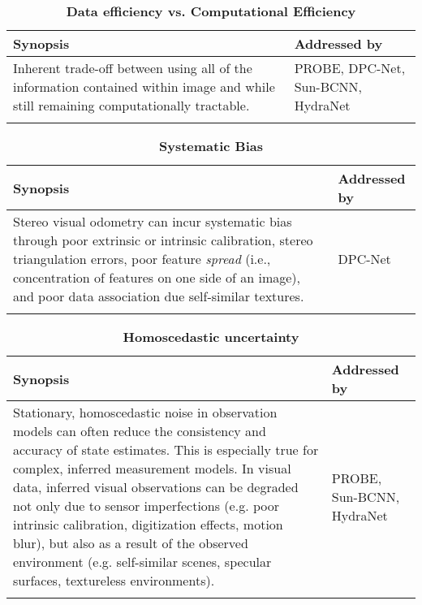\begin{table}[h!]
	\caption{\textbf{Data efficiency vs. Computational Efficiency}}	\begin{threeparttable}
	\begin{tabular}{m{}m{}}
		\toprule
		\textbf{Synopsis} & \textbf{Addressed by} \\ \midrule  
		Inherent trade-off between using all of the information contained within image and while still remaining computationally tractable. & PROBE, DPC-Net, Sun-BCNN, HydraNet \\
		& \\
		\bottomrule
	\end{tabular}
\end{threeparttable}
\end{table}


\begin{table}[h!]
	\caption{\textbf{Systematic Bias}}
	\begin{threeparttable}
	\begin{tabular}{m{}m{}}
		\toprule
		\textbf{Synopsis} & \textbf{Addressed by} \\ \midrule  
		Stereo visual odometry can incur systematic bias through poor extrinsic or intrinsic calibration, stereo triangulation errors, poor feature \textit{spread} (i.e., concentration of features on one side of an image), and poor data association due self-similar textures. &  DPC-Net \\
		& \\
		\bottomrule
	\end{tabular}
\end{threeparttable}
\end{table}


\begin{table}[h!]
	\caption{\textbf{Homoscedastic uncertainty}}
	\begin{threeparttable}
	\begin{tabular}{m{}m{}}
		\toprule
		\textbf{Synopsis} & \textbf{Addressed by} \\ \midrule  
		Stationary, homoscedastic noise in observation models can often reduce the consistency and accuracy of state estimates. This is especially true for complex, inferred measurement models. In visual data, inferred visual observations can be degraded not only due to sensor imperfections (e.g. poor intrinsic calibration, digitization effects, motion blur), but also as a result of the observed environment (e.g. self-similar scenes, specular surfaces, textureless environments). &  PROBE, Sun-BCNN, HydraNet \\
		& \\
		\bottomrule
	\end{tabular}
\end{threeparttable}
\end{table}

